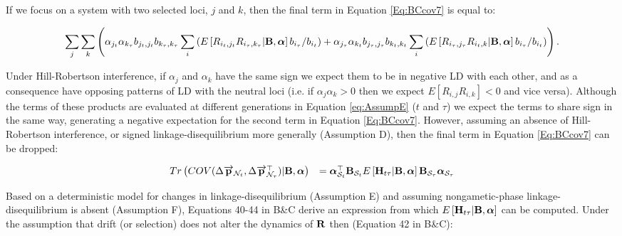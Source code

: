 \documentclass[12pt]{article}
\begin{document}
\begin{bibunit}
If we focus on a system with two selected loci, $j$ and $k$, then the final term in Equation \ref{Eq:BCcov7} is equal to:
\begin{tiny}
\begin{equation}
\sum_j\sum_k\left(\alpha_{j_t}\alpha_{k_{\tau}}b_{j_t,j_t}b_{k_{\tau},k_{\tau}}\sum _i \left(E\left[R_{i_t,j_t}R_{i_{\tau},k_{\tau}} | {\bf B}, \boldsymbol{\alpha}\right]b_{i_\tau}/b_{i_t}\right)+\alpha_{j_{\tau}}\alpha_{k_t}b_{j_{\tau},j_{\tau}}b_{k_t,k_t}\sum _i \left(E\left[R_{i_{\tau},j_{\tau}}R_{i_t,k} | {\bf B}, \boldsymbol{\alpha}\right]b_{i_\tau}/b_{i_t}\right)\right).
\label{eq:AssumpE}
\end{equation}
\end{tiny}

Under Hill-Robertson interference, if $\alpha_j$ and $\alpha_k$ have the same sign we expect them to be in negative LD with each other, and as a consequence have opposing patterns of LD with the neutral loci (i.e. if $\alpha_j\alpha_k>0$ then we expect $E[R_{i,j}R_{i,k}]<0$ and vice versa). Although the terms of these products are evaluated at different generations in Equation \ref{eq:AssumpE} ($t$ and $\tau$) we expect the terms to share sign in the same way, generating a negative expectation for the second term in Equation \ref{Eq:BCcov7}.  However, assuming an absence of Hill-Robertson interference, or signed linkage-disequilibrium more generally (Assumption D), then the final term in Equation \ref{Eq:BCcov7} can be dropped:

\begin{equation}
\begin{array}{rl}
Tr\left(COV(\Delta \overrightarrow{\bf p}_{{\mathcal N}_t}, \Delta \overrightarrow{\bf p}_{{\mathcal N}_{\tau}}^\top) | {\bf B}, \boldsymbol{\alpha}\right)&=
\boldsymbol{\alpha}_{{\mathcal S}_t}^{\top}{\bf B}_{{\mathcal S}_t}E\left[{\bf H}_{t\tau} | {\bf B}, \boldsymbol{\alpha}\right]{\bf B}_{{\mathcal S}_{\tau}}\boldsymbol{\alpha}_{{\mathcal S}_{\tau}}
\end{array}
\label{Eq:BCcov8}
\end{equation}

Based on a deterministic model for changes in linkage-disequilibrium (Assumption E) and assuming nongametic-phase linkage-disequilibrium is absent (Assumption F), Equations 40-44 in B\&C derive an expression from which $E\left[{\bf H}_{t\tau} | {\bf B}, \boldsymbol{\alpha}\right]$ can be computed. Under the assumption that drift (or selection) does not alter the dynamics of ${\bf R}$ then (Equation 42 in B\&C):


\end{bibunit}
\end{document}
